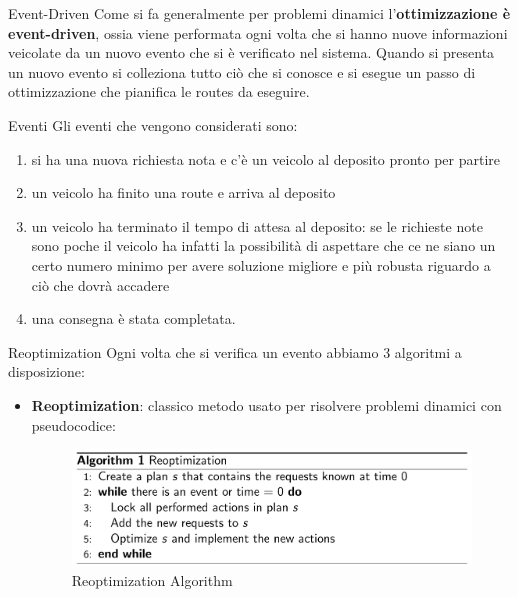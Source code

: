 \documentclass[10pt]{beamer}
\begin{document}
    \begin{frame}{Event-Driven}
         Come si fa generalmente per problemi dinamici l'\textbf{ottimizzazione è event-driven}, ossia viene performata ogni volta che si hanno nuove informazioni veicolate da un nuovo evento che si è verificato nel sistema. Quando si presenta un nuovo evento si colleziona tutto ciò che si conosce e si esegue un passo di ottimizzazione che pianifica le routes da eseguire.
    \end{frame}

    \begin{frame}{Eventi}
        Gli eventi che vengono considerati sono:

        \begin{enumerate}
            \label{events}
            \item si ha una nuova richiesta nota e c'è un veicolo al deposito pronto per partire
            \item un veicolo ha finito una route e arriva al deposito
            \item un veicolo ha terminato il tempo di attesa al deposito: se le richieste note sono poche il veicolo ha infatti la possibilità di aspettare che ce ne siano un certo numero minimo per avere soluzione migliore e più robusta riguardo a ciò che dovrà accadere
            \item una consegna è stata completata. 
        \end{enumerate}
    \end{frame}

    \begin{frame}{Reoptimization}
        Ogni volta che si verifica un evento abbiamo 3 algoritmi a disposizione:

        \begin{itemize}
            \item \textbf{Reoptimization}: classico metodo usato per risolvere problemi dinamici con pseudocodice: 
                \begin{figure}[h!]
                    \centering
                    \includegraphics[scale=0.25]{Images/Reoptimization.png}
                    \caption{Reoptimization Algorithm}
                    \label{fig:reoptimization}
                \end{figure}
        \end{itemize}
    \end{frame}
\end{document}
